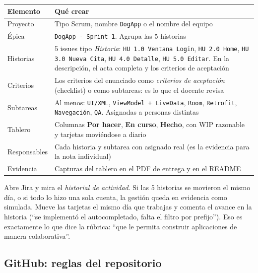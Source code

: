 \documentclass[11pt,letterpaper]{article}
\newcommand{\code}[1]{\texttt{\small #1}}
\begin{document}
\begin{center}
\small
\begin{xltabular}{\linewidth}{@{}l X@{}}
\toprule
\textbf{Elemento} & \textbf{Qu\'e crear}\\
\midrule
\endhead
\bottomrule
\endlastfoot
Proyecto & Tipo Scrum, nombre \code{DogApp} o el nombre del equipo\\
\'Epica & \code{DogApp - Sprint 1}. Agrupa las 5 historias\\
Historias & 5 issues tipo \emph{Historia}: \code{HU 1.0 Ventana Login}, \code{HU 2.0 Home}, \code{HU 3.0 Nueva Cita}, \code{HU 4.0 Detalle}, \code{HU 5.0 Editar}. En la descripci\'on, el acta completa y los criterios de aceptaci\'on\\
Criterios & Los criterios del enunciado como \emph{criterios de aceptaci\'on} (checklist) o como subtareas: es lo que el docente revisa\\
Subtareas & Al menos: \code{UI/XML}, \code{ViewModel + LiveData}, \code{Room}, \code{Retrofit}, \code{Navegaci\'on}, \code{QA}. Asignadas a personas distintas\\
Tablero & Columnas \textbf{Por hacer}, \textbf{En curso}, \textbf{Hecho}, con WIP razonable y tarjetas movi\'endose a diario\\
Responsables & Cada historia y subtarea con asignado real (es la evidencia para la nota individual)\\
Evidencia & Capturas del tablero en el PDF de entrega y en el README\\
\end{xltabular}
\end{center}

\begin{notabox}
Abre Jira y mira el \emph{historial de actividad}. Si las 5 historias se movieron
el mismo d\'ia, o si todo lo hizo una sola cuenta, la gesti\'on queda en evidencia
como simulada. Mueve las tarjetas el mismo d\'ia que trabajas y comenta el avance
en la historia (``se implement\'o el autocompletado, falta el filtro por
prefijo''). Eso es exactamente lo que dice la r\'ubrica: ``que le permita construir
aplicaciones de manera colaborativa''.
\end{notabox}

\subsection{GitHub: reglas del repositorio}
\end{document}

